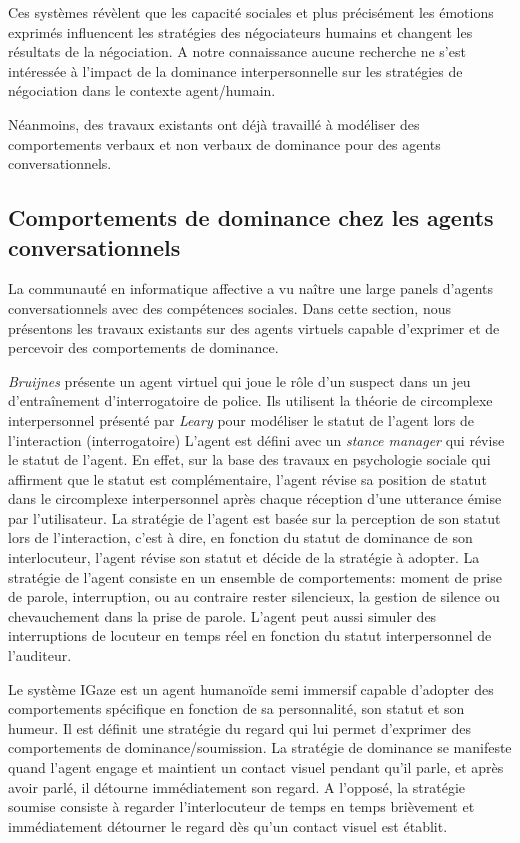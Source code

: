 	 Ces systèmes révèlent que les capacité sociales et plus précisément les émotions exprimés influencent les stratégies des négociateurs humains et changent les résultats de la négociation. A notre connaissance aucune recherche ne s'est intéressée à l'impact de la dominance interpersonnelle sur les stratégies de négociation dans le contexte agent/humain. 
	 
	 Néanmoins, des travaux existants ont déjà travaillé à modéliser des comportements verbaux et non verbaux de dominance pour des agents conversationnels. 
	 
	 \subsection{Comportements de dominance chez les agents conversationnels}
	 
	 	La communauté en informatique affective a vu naître une large panels d'agents conversationnels avec des compétences sociales. Dans cette section, nous présentons les travaux existants sur des agents virtuels capable d'exprimer et de percevoir des comportements de dominance. 
	 	
		\emph{Bruijnes} \cite{bruijnes2013affective} présente un agent virtuel qui joue le rôle d'un suspect dans un jeu d'entraînement 
		d'interrogatoire de police.
		 Ils utilisent la théorie de circomplexe interpersonnel présenté par \emph{Leary} \cite{leary2004interpersonal} pour modéliser le statut de l'agent lors de l'interaction (interrogatoire)
		L'agent est défini avec un \textit{stance manager} qui révise le statut de l'agent. En effet, sur la base des travaux en psychologie sociale qui affirment que le statut est complémentaire, l'agent révise sa position de statut dans le circomplexe interpersonnel après chaque réception d'une utterance émise par l'utilisateur. La stratégie de l'agent est basée sur la perception de son statut lors de l'interaction, c'est à dire, en fonction du statut de dominance de son interlocuteur, l'agent révise son statut et décide de la stratégie à adopter. La stratégie de l'agent consiste en un ensemble de comportements: moment de prise de parole, interruption, ou au contraire rester silencieux, la gestion de silence ou chevauchement dans la prise de parole. L'agent peut aussi simuler des interruptions de locuteur en temps réel en fonction du statut interpersonnel de l'auditeur.
		
		Le système	IGaze  \cite{kipp2008igaze} est un agent humanoïde semi immersif capable d'adopter des comportements spécifique en fonction de sa personnalité, son statut et son humeur. Il est définit une stratégie du regard qui lui permet d'exprimer des comportements de dominance/soumission. La stratégie de dominance se manifeste quand l'agent engage et maintient un contact visuel pendant qu'il parle, et après avoir parlé, il détourne immédiatement son regard. A l'opposé, la stratégie soumise consiste à regarder l'interlocuteur de temps en temps brièvement et immédiatement détourner le regard dès qu'un contact visuel est établit. 
		
